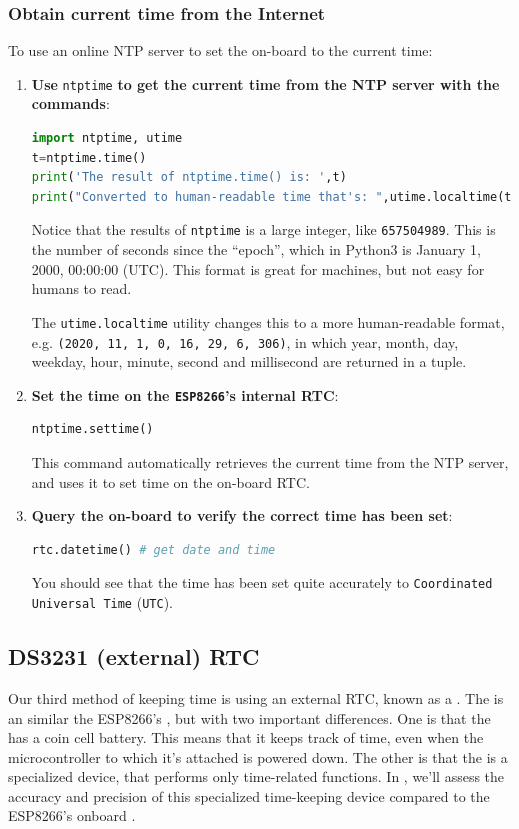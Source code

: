 \subsubsection{\howto Obtain current time from the Internet}
To use an online NTP server to set the on-board \rtc to the current time:
\begin{enumerate}
	\item \textbf{Use} \lstinline{ntptime} \textbf{to get the current time from the NTP server with the commands}:
\begin{lstlisting}[language=Python]
import ntptime, utime
t=ntptime.time()
print('The result of ntptime.time() is: ',t)
print("Converted to human-readable time that's: ",utime.localtime(t))
\end{lstlisting}
	Notice that the results of \lstinline{ntptime} is a large integer, like \texttt{657504989}. 
	This is the number of seconds since the ``epoch'', which in Python3 is January 1, 2000, 00:00:00 (UTC).
	This format is great for machines, but not easy for humans to read.
	
	\smallskip
	The \lstinline{utime.localtime} utility changes this to a more human-readable format, e.g. \texttt{(2020, 11, 1, 0, 16, 29, 6, 306)}, in which year, month, day, weekday, hour, minute, second and millisecond are returned in a tuple.
	
	\item \textbf{Set the time on the \texttt{ESP8266}’s internal RTC}:
\begin{lstlisting}[language=Python]
ntptime.settime()
\end{lstlisting}
	This command automatically retrieves the current time from the NTP server, and uses it to set time on the on-board RTC.
	
	\item \textbf{Query the on-board \rtc to verify the correct time has been set}:
\begin{lstlisting}[language=Python]
rtc.datetime() # get date and time
\end{lstlisting}
	You should see that the time has been set quite accurately to \texttt{Coordinated Universal Time} (\texttt{UTC}). 
\end{enumerate}


\subsection{DS3231 (external) RTC}
Our third method of keeping time is using an external RTC, known as a .
The  is an \rtc similar the ESP8266's \rtc, but with two important differences. 
One is that the  has a coin cell battery.
This means that it keeps track of time, even when the microcontroller to which it's attached is powered down.
The other is that the  is a specialized device, that performs only time-related functions. 
In , we'll assess the accuracy and precision of this specialized time-keeping device compared to the ESP8266's onboard \rtc.

